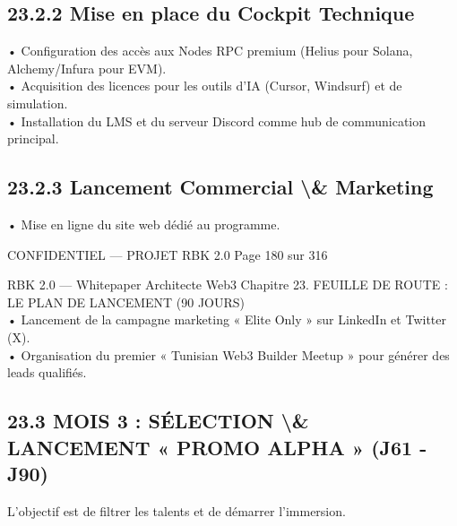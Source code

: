\subsection{23.2.2 Mise en place du Cockpit Technique}
• Configuration des accès aux Nodes RPC premium (Helius pour Solana, Alchemy/Infura pour EVM).\\
\vspace{0.5em}
• Acquisition des licences pour les outils d’IA (Cursor, Windsurf) et de simulation.\\
\vspace{0.5em}
• Installation du LMS et du serveur Discord comme hub de communication principal.\\
\vspace{0.5em}
\vspace{0.5em}
\subsection{23.2.3 Lancement Commercial \textbackslash{}& Marketing}
• Mise en ligne du site web dédié au programme.\\
\vspace{0.5em}
\vspace{0.5em}
\vspace{0.5em}
\begin{confidential}CONFIDENTIEL — PROJET RBK 2.0                                  Page 180 sur 316\end{confidential}
RBK 2.0 — Whitepaper Architecte Web3                                   Chapitre 23. FEUILLE DE ROUTE : LE PLAN DE LANCEMENT (90 JOURS)\\
\vspace{0.5em}
\vspace{0.5em}
• Lancement de la campagne marketing « Elite Only » sur LinkedIn et Twitter (X).\\
\vspace{0.5em}
• Organisation du premier « Tunisian Web3 Builder Meetup » pour générer des leads qualifiés.\\
\vspace{0.5em}
\vspace{0.5em}
\subsection{23.3 MOIS 3 : SÉLECTION \textbackslash{}& LANCEMENT « PROMO ALPHA » (J61 - J90)}
L’objectif est de filtrer les talents et de démarrer l’immersion.\\
\vspace{0.5em}
\vspace{0.5em}
